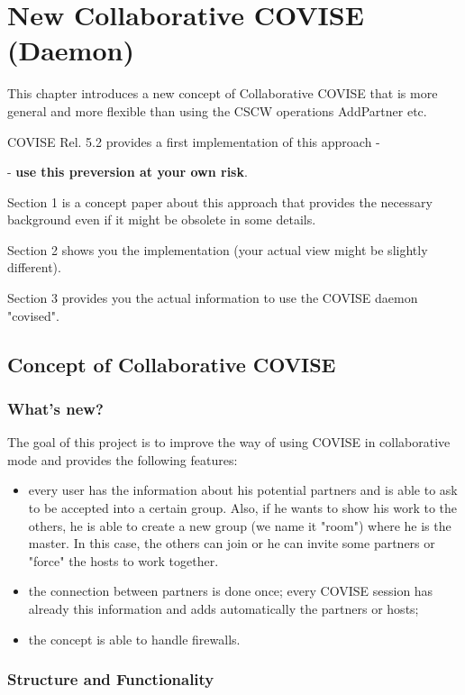 \clearpage

\section{New Collaborative COVISE (Daemon)}
\label{NewCollab}

This chapter introduces a new concept of Collaborative COVISE that is more general and
more flexible than using the CSCW operations AddPartner etc.

COVISE Rel. 5.2 provides a first implementation of this approach - 

- {\bf use this preversion at your own risk}.  

Section 1 is a concept paper about this approach that provides the necessary background
even if it might be obsolete in some details.

Section 2 shows you the implementation (your actual view might be slightly different).

Section 3 provides you the actual information to use the COVISE daemon "covised".


\subsection{Concept of Collaborative COVISE}

\subsubsection{What's new?}


The goal of this project is to improve the way of using COVISE in collaborative mode 
and provides the following features:
\begin{itemize}
\item every user has the information about his potential partners and is able to ask 
to be accepted into a certain group. Also, if he wants to show his 
work to the others, he is able to create a new group (we name it "room") 
where he is the master. In this case, the others can join or he can invite some 
partners or "force" the hosts to  work together.
\item the connection between partners is done once; every COVISE session has 
already this information and adds automatically the partners or hosts;
\item the concept is able to handle firewalls.
\end{itemize}

\subsubsection{Structure and Functionality}

